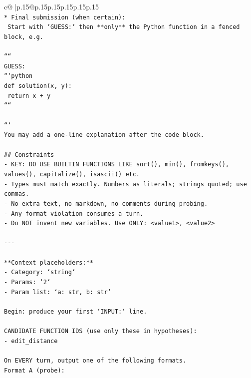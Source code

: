 \documentclass{article}
\begin{document}
{\begin{supertabular}{c@{$\;$}|p{.15\linewidth}@{}p{.15\linewidth}p{.15\linewidth}p{.15\linewidth}p{.15\linewidth}p{.15\linewidth}}
{{{\\ 
\texttt{* Final submission (when certain):} \\
\texttt{  Start with `GUESS:` then **only** the Python function in a fenced block, e.g.} \\
\\ 
\texttt{````} \\
\texttt{GUESS:} \\
\texttt{```python} \\
\texttt{def solution(x, y):} \\
\texttt{    return x + y} \\
\texttt{````} \\
\\ 
\texttt{```} \\
\texttt{You may add a one{-}line explanation after the code block.} \\
\\ 
\texttt{\#\# Constraints} \\
\texttt{{-} KEY: DO USE BUILTIN FUNCTIONS LIKE sort(), min(), fromkeys(), values(), capitalize(), isascii() etc.} \\
\texttt{{-} Types must match exactly. Numbers as literals; strings quoted; use commas.} \\
\texttt{{-} No extra text, no markdown, no comments during probing.} \\
\texttt{{-} Any format violation consumes a turn.} \\
\texttt{{-} Do NOT invent new variables. Use ONLY: <value1>, <value2>} \\
\\ 
\texttt{{-}{-}{-}} \\
\\ 
\texttt{**Context placeholders:**} \\
\texttt{{-} Category: `string`} \\
\texttt{{-} Params: `2`} \\
\texttt{{-} Param list: `a: str, b: str`} \\
\\ 
\texttt{Begin: produce your first `INPUT:` line.} \\
\\ 
\texttt{CANDIDATE FUNCTION IDS (use only these in hypotheses):} \\
\texttt{{-} edit\_distance} \\
\\ 
\texttt{On EVERY turn, output one of the following formats.} \\
\texttt{Format A (probe):} \\
}}}
\end{supertabular}}
\end{document}
